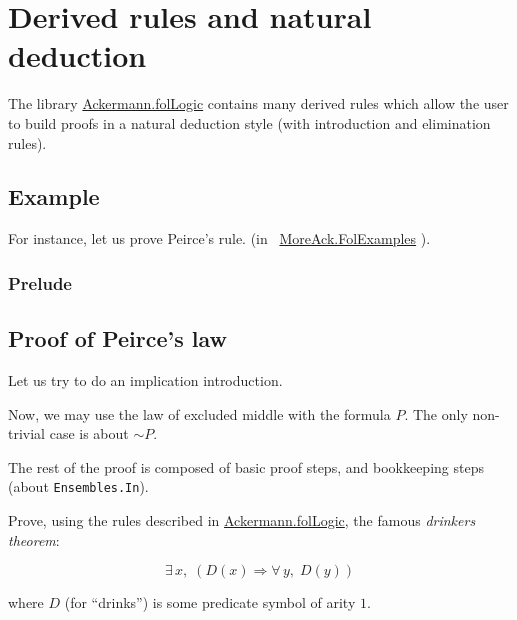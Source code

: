 \section{Derived rules and natural deduction}


 The library 
 \href{../theories/html/hydras.Ackermann.folLogic.html}{Ackermann.folLogic} contains many derived rules which allow the user to build proofs in a natural deduction style (with introduction and elimination rules).

\subsection{Example}

For instance, let us prove Peirce's rule.
 (in  ~\href{../theories/html/hydras.MoreAck.FolExamples.html}{MoreAck.FolExamples} ).

\subsubsection{Prelude}



\subsection{Proof of Peirce's law}



Let us try to do an implication introduction.


Now, we may use the law of excluded middle with the formula $P$. The only non-trivial case is about $\sim P$.


The rest of the proof is composed of basic proof steps, 
and bookkeeping steps (about \texttt{Ensembles.In}).


\begin{exercise}
Prove, using the rules described in 
 \href{../theories/html/hydras.Ackermann.folLogic.html}{Ackermann.folLogic}, the famous \emph{drinkers theorem}:

$$\exists\,x,\; (D(x)\Longrightarrow \forall\,y,\; D(y))$$
\end{exercise}

where $D$ (for ``drinks'') is some predicate symbol of arity $1$.


